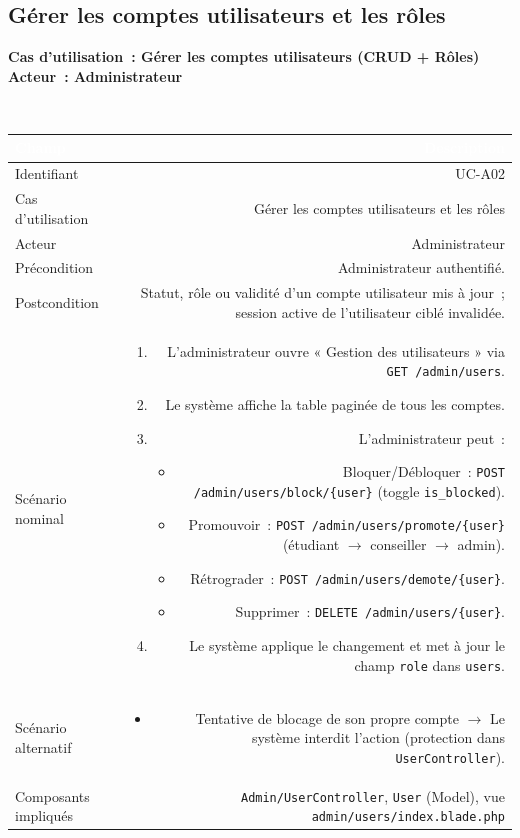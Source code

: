\documentclass[a4paper,12pt]{article}
\newcommand{\ucheader}[2]{%
  \noindent\colorbox{capblue}{\parbox{\dimexpr\linewidth-2\fboxsep}{%
    \color{white}\bfseries\large Cas d'utilisation~: #1 \hfill \normalsize Acteur~: #2
  }}\\[2pt]
}
\begin{document}
\vspace{1em}

\subsection{Gérer les comptes utilisateurs et les rôles}
\ucheader{Gérer les comptes utilisateurs (CRUD + Rôles)}{Administrateur}

\noindent
\begin{tabular}{|L|R|}
\hline
{}\textcolor{white}{\textbf{Champ}} & \textcolor{white}{\textbf{Description}} \\
\hline
{}Identifiant & UC-A02 \\
\hline
Cas d'utilisation & Gérer les comptes utilisateurs et les rôles \\
\hline
{}Acteur & Administrateur \\
\hline
Précondition & Administrateur authentifié. \\
\hline
{}Postcondition & Statut, rôle ou validité d'un compte utilisateur mis à jour~; session active de l'utilisateur ciblé invalidée. \\
\hline
Scénario nominal &
\begin{enumerate}
  \item L'administrateur ouvre « Gestion des utilisateurs » via \texttt{GET /admin/users}.
  \item Le système affiche la table paginée de tous les comptes.
  \item L'administrateur peut~:
  \begin{itemize}
    \item Bloquer/Débloquer~: \texttt{POST /admin/users/block/\{user\}} (toggle \texttt{is\_blocked}).
    \item Promouvoir~: \texttt{POST /admin/users/promote/\{user\}} (étudiant $\rightarrow$ conseiller $\rightarrow$ admin).
    \item Rétrograder~: \texttt{POST /admin/users/demote/\{user\}}.
    \item Supprimer~: \texttt{DELETE /admin/users/\{user\}}.
  \end{itemize}
  \item Le système applique le changement et met à jour le champ \texttt{role} dans \texttt{users}.
\end{enumerate} \\
\hline
{}Scénario alternatif &
\begin{itemize}
  \item Tentative de blocage de son propre compte $\rightarrow$ Le système interdit l'action (protection dans \texttt{UserController}).
\end{itemize} \\
\hline
Composants impliqués & \texttt{Admin/UserController}, \texttt{User} (Model), vue \texttt{admin/users/index.blade.php} \\
\hline
\end{tabular}
\end{document}
